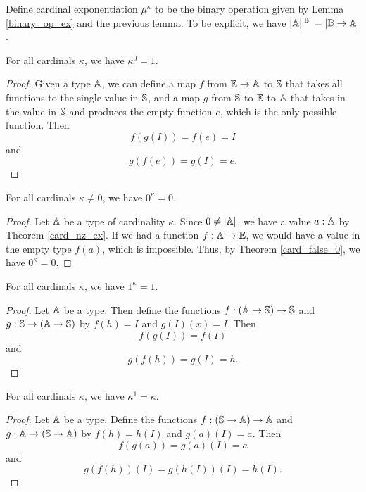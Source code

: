 \documentclass[../../math.tex]{subfiles}
\begin{document}
\begin{definition}
    Define cardinal exponentiation $\mu^\kappa$ to be the binary operation given
    by Lemma \ref{binary_op_ex} and the previous lemma.  To be explicit, we have
    $|\A|^{|\B|} = |\B \to \A|$.
\end{definition}

\begin{theorem}
    For all cardinals $\kappa$, we have $\kappa^0 = 1$.
\end{theorem}
\begin{proof}
    Given a type $\A$, we can define a map $f$ from $\E \to \A$ to $\S$ that
    takes all functions to the single value in $\S$, and a map $g$ from $\S$ to
    $\E$ to $\A$ that takes in the value in $\S$ and produces the empty
    function $e$, which is the only possible function.  Then
    \[
        f(g(I)) = f(e) = I
    \]
    and
    \[
        g(f(e)) = g(I) = e.
    \]
\end{proof}

\begin{theorem}
    For all cardinals $\kappa \neq 0$, we have $0 ^ \kappa = 0$.
\end{theorem}
\begin{proof}
    Let $\A$ be a type of cardinality $\kappa$.  Since $0 \neq |\A|$, we have a
    value $a : \A$ by Theorem \ref{card_nz_ex}.  If we had a function $f : \A
    \to \E$, we would have a value in the empty type $f(a)$, which is
    impossible.  Thus, by Theorem \ref{card_false_0}, we have $0^\kappa = 0$.
\end{proof}

\begin{theorem}
    For all cardinals $\kappa$, we have $1^\kappa = 1$.
\end{theorem}
\begin{proof}
    Let $\A$ be a type.  Then define the functions $f : (\A \to \S) \to \S$ and
    $g : \S \to (\A \to \S)$ by $f(h) = I$ and $g(I)(x) = I$.  Then
    \[
        f(g(I)) = f(I)
    \]
    and
    \[
        g(f(h)) = g(I) = h.
    \]
\end{proof}

\begin{theorem}
    For all cardinals $\kappa$, we have $\kappa ^ 1 = \kappa$.
\end{theorem}
\begin{proof}
    Let $\A$ be a type.  Define the functions $f : (\S \to \A) \to \A$ and $g :
    \A \to (\S \to \A)$ by $f(h) = h(I)$ and $g(a)(I) = a$.  Then
    \[
        f(g(a)) = g(a)(I) = a
    \]
    and
    \[
        g(f(h))(I) = g(h(I))(I) = h(I).
    \]
\end{proof}
\end{document}

